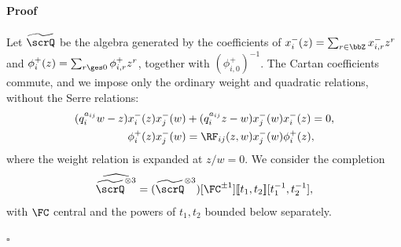 \documentclass[reqno]{amsart}
\numberwithin{equation}{section}
\newenvironment{pf}{\medskip\paragraph{{\sc Proof}}}{\hfill$\square$\par\medskip}
\begin{document}
\begin{pf}
Let $\widetilde{\scrQ}$ be the algebra generated by the coefficients of
$x_i^-(z)=\sum_{r\in\bbZ}x_{i,r}^-z^r$ and
$\phi_i^+(z)=\sum_{r\ges0}\phi_{i,r}^+z^r$, together with
$(\phi_{i,0}^+)^{-1}$. The Cartan coefficients commute, and we impose
only the ordinary weight and quadratic relations, without the Serre relations:
\begin{equation}\label{app:quadratic-word-algebra}
\begin{split}
(q_i^{a_{ij}}w-z)x_i^-(z)x_j^-(w)
 &+(q_i^{a_{ij}}z-w)x_j^-(w)x_i^-(z)=0,\\
\phi_i^+(z)x_j^-(w)
 &=\RF_{ij}(z,w)x_j^-(w)\phi_i^+(z),
\end{split}
\end{equation}
where the weight relation is expanded at $z/w=0$.
We consider the completion
\[
\widehat{\widetilde{\scrQ}^{\otimes3}}
=(\widetilde{\scrQ}^{\otimes3})[\FC^{\pm1}]
[\negthinspace[t_1,t_2]\negthinspace][t_1^{-1},t_2^{-1}],
\]
with $\FC$ central and the powers of $t_1,t_2$ bounded below separately.


\end{pf}
\end{document}
